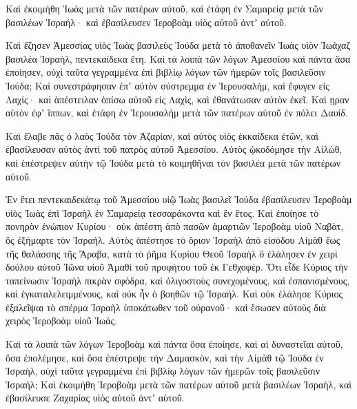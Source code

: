 {Καὶ ἐκοιμήθη Ἰωὰς μετὰ τῶν πατέρων αὐτοῦ, καὶ ἐτάφη ἐν Σαμαρείᾳ μετὰ τῶν βασιλέων Ἰσραήλ· καὶ ἐβασίλευσεν Ἰεροβοὰμ υἱὸς αὐτοῦ ἀντʼ αὐτοῦ.
\par }{\PP {}Καὶ ἔζησεν Ἀμεσσίας υἱὸς Ἰωὰς βασιλεὺς Ἰούδα μετὰ τὸ ἀποθανεῖν Ἰωὰς υἱὸν Ἰωάχαζ βασιλέα Ἰσραὴλ, πεντεκαίδεκα ἔτη.
Καὶ τὰ λοιπὰ τῶν λόγων Ἀμεσσίου καὶ πάντα ἅσα ἐποίησεν, οὐχὶ ταῦτα γεγραμμένα ἐπὶ βιβλίῳ λόγων τῶν ἡμερῶν τοῖς βασιλεῦσιν Ἰούδα;
Καὶ συνεστράφησαν ἐπʼ αὐτὸν σύστρεμμα ἐν Ἱερουσαλὴμ, καὶ ἔφυγεν εἰς Λαχίς· καὶ ἀπέστειλαν ὀπίσω αὐτοῦ εἰς Λαχὶς, καὶ ἐθανάτωσαν αὐτὸν ἐκεῖ.
Καὶ ῃραν αὐτὸν ἐφʼ ἵππων, καὶ ἐτάφη ἐν Ἱερουσαλὴμ μετὰ τῶν πατέρων αὐτοῦ ἐν πόλει Δαυίδ.
\par }{\PP {}Καὶ ἔλαβε πᾶς ὁ λαὸς Ἰούδα τὸν Ἀζαρίαν, καὶ αὐτὸς υἱὸς ἑκκαίδεκα ἐτῶν, καὶ ἐβασίλευσαν αὐτὸς ἀντὶ τοῦ πατρὸς αὐτοῦ Ἀμεσσίου.
Αὐτὸς ᾠκοδόμησε τὴν Αἰλὼθ, καὶ ἐπέστρεψεν αὐτὴν τῷ Ἰούδα μετὰ τὸ κοιμηθῆναι τὸν βασιλέα μετὰ τῶν πατέρων αὐτοῦ.
\par }{\PP {}Ἐν ἔτει πεντεκαιδεκάτῳ τοῦ Ἀμεσσίου υἱῷ Ἰωὰς βασιλεῖ Ἰούδα ἐβασίλευσεν Ἱεροβοὰμ υἱὸς Ἰωὰς ἐπὶ Ἰσραὴλ ἐν Σαμαρείᾳ τεσσαράκοντα καὶ ἓν ἔτος.
Καὶ ἐποίησε τὸ πονηρὸν ἐνώπιον Κυρίου· οὐκ ἀπέστη ἀπὸ πασῶν ἁμαρτιῶν Ἰεροβοὰμ υἱοῦ Ναβὰτ, ὃς ἐξήμαρτε τὸν Ἰσραήλ.
Αὐτὸς ἀπέστησε τὸ ὅριον Ἰσραὴλ ἀπὸ εἰσόδου Αἰμὰθ ἕως τῆς θαλάσσης τῆς Ἄραβα, κατὰ τὸ ῥῆμα Κυρίου Θεοῦ Ἰσραὴλ ὃ ἐλάλησεν ἐν χειρὶ δούλου αὐτοῦ Ἰῶνα υἱοῦ Ἀμαθὶ τοῦ προφήτου τοῦ ἐκ Γεθχοφέρ.
Ὅτι εἶδε Κύριος τὴν ταπείνωσιν Ἰσραὴλ πικρὰν σφόδρα, καὶ ὀλιγοστοὺς συνεχομένους, καὶ ἐσπανισμένους, καὶ ἐγκαταλελειμμένους, καὶ οὐκ ἦν ὁ βοηθῶν τῷ Ἰσραήλ.
Καὶ οὐκ ἐλάλησε Κύριος ἐξαλεῖψαι τὸ σπέρμα Ἰσραὴλ ὑποκάτωθεν τοῦ οὐρανοῦ· καὶ ἔσωσεν αὐτοὺς διὰ χειρὸς Ἱεροβοὰμ υἱοῦ Ἰωάς.
\par }{\PP {}Καὶ τὰ λοιπὰ τῶν λόγων Ἱεροβοὰμ καὶ πάντα ὅσα ἐποίησε, καὶ αἱ δυναστεῖαι αὐτοῦ, ὅσα ἐπολέμησε, καὶ ὅσα ἐπέστρεψε τὴν Δαμασκὸν, καὶ τὴν Αἰμὰθ τῷ Ἰούδα ἐν Ἰσραὴλ, οὐχὶ ταῦτα γεγραμμένα ἐπὶ βιβλίῳ λόγων τῶν ἡμερῶν τοῖς βασιλεῦσιν Ἰσραήλ;
Καὶ ἐκοιμήθη Ἱεροβοὰμ μετὰ τῶν πατέρων αὐτοῦ μετὰ βασιλέων Ἰσραὴλ, καὶ ἐβασίλευσε Ζαχαρίας υἱὸς αὐτοῦ ἀντʼ αὐτοῦ.

}
